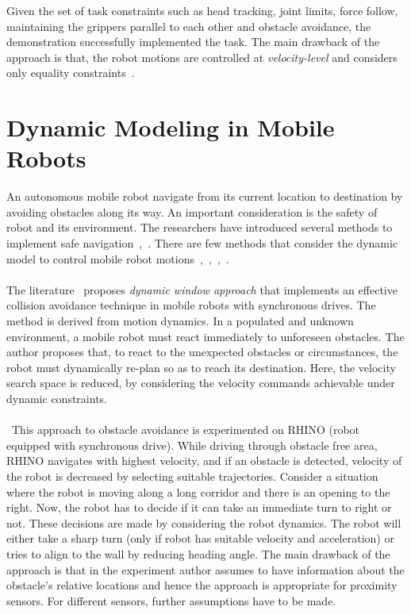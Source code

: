 Given the set of task constraints such as head tracking, joint limits, force follow, maintaining the grippers parallel to each other and obstacle avoidance, the demonstration successfully implemented the task. The main drawback of the approach is that, the robot motions are controlled at \textit{velocity-level} and considers only equality constraints~\cite{itasc-software}.

\section{Dynamic Modeling in Mobile Robots} \label{sec:dynamic-modeling}

An autonomous mobile robot navigate from its current location to destination by avoiding obstacles along its way. An important consideration is the safety of robot and its environment. The researchers have introduced several methods to implement safe navigation~\cite{borenstein1990real},~\cite{adouane2011mobile}. There are few methods that consider the dynamic model to control mobile robot motions~\cite{fox1997dynamic},~\cite{asensio2002kinematic},~\cite{ge2002dynamic},~\cite{borenstein1989real}. 

\paragraph{}The literature~\cite{fox1997dynamic} proposes \textit{dynamic window approach} that implements an effective collision avoidance technique in mobile robots with synchronous drives. The method is derived from motion dynamics. In a populated and unknown environment, a mobile robot must react immediately to unforeseen obstacles. The author proposes that, to react to the unexpected obstacles or circumstances, the robot must dynamically re-plan so as to reach its destination. Here, the velocity search space is reduced, by considering the velocity commands achievable under dynamic constraints. 

\paragraph{}\cite{fox1997dynamic}~This approach to obstacle avoidance is experimented on RHINO (robot equipped with synchronous drive). While driving through obstacle free area, RHINO navigates with highest velocity, and if an obstacle is detected, velocity of the robot is decreased by selecting suitable trajectories. Consider a situation where the robot is moving along a long corridor and there is an opening to the right. Now, the robot has to decide if it can take an immediate turn to right or not. These decisions are made by considering the robot dynamics. The robot will either take a sharp turn (only if robot has suitable velocity and acceleration) or tries to align to the wall by reducing heading angle. The main drawback of the approach is that in the experiment author assumes to have information about the obstacle's relative locations and hence the approach is appropriate for proximity sensors. For different sensors, further assumptions have to be made. 

